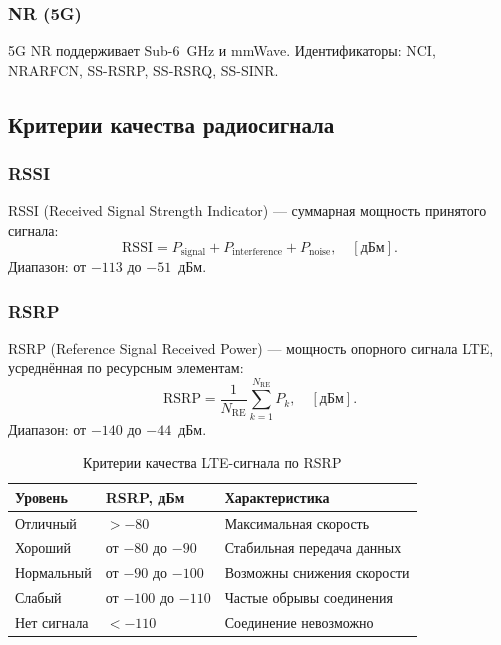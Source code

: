 \documentclass[a4paper,14pt,oneside,openany]{memoir}
\begin{document}
\subsubsection{NR (5G)}

5G NR поддерживает Sub-6~GHz и mmWave. Идентификаторы: NCI, NRARFCN,
SS-RSRP, SS-RSRQ, SS-SINR.

\subsection{Критерии качества радиосигнала}

\subsubsection{RSSI}

RSSI (Received Signal Strength Indicator) --- суммарная мощность принятого
сигнала:
\begin{equation}
  \mathrm{RSSI} = P_{\mathrm{signal}} + P_{\mathrm{interference}} +
  P_{\mathrm{noise}}, \quad [\text{дБм}].
\end{equation}
Диапазон: от $-113$ до $-51$~дБм.

\subsubsection{RSRP}

RSRP (Reference Signal Received Power) --- мощность опорного сигнала LTE,
усреднённая по ресурсным элементам:
\begin{equation}
  \mathrm{RSRP} = \frac{1}{N_{\mathrm{RE}}} \sum_{k=1}^{N_{\mathrm{RE}}} P_k,
  \quad [\text{дБм}].
\end{equation}
Диапазон: от $-140$ до $-44$~дБм.

\begin{table}[H]
\centering
\caption{Критерии качества LTE-сигнала по RSRP}
\begin{tabular}{lll}
\toprule
\textbf{Уровень} & \textbf{RSRP, дБм} & \textbf{Характеристика}\\
\midrule
Отличный    & $> -80$              & Максимальная скорость\\
Хороший     & от $-80$ до $-90$    & Стабильная передача данных\\
Нормальный  & от $-90$ до $-100$   & Возможны снижения скорости\\
Слабый      & от $-100$ до $-110$  & Частые обрывы соединения\\
Нет сигнала & $< -110$             & Соединение невозможно\\
\bottomrule
\end{tabular}
\end{table}
\end{document}
